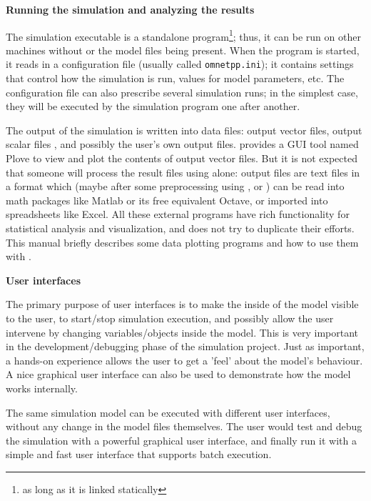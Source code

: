 \textbf{Running the simulation and analyzing the results}

The simulation executable is a standalone program\footnote{as long as
  it is linked statically}; thus, it can be run on other machines
without {\opp} or the model files being present. When the program is
started, it reads in a configuration
file (usually called
\texttt{omnetpp.ini}); it contains settings that
control how the simulation is run, values for model parameters, etc.
The configuration file can also prescribe several simulation runs; in
the simplest case, they will be executed by the simulation program one
after another.

The output of the simulation is written into data files: output vector
files, output scalar files
, and possibly the user's own output files.
{\opp} provides a GUI tool named Plove to view and plot the contents
of output vector files. But it is not expected that someone will
process the result files using {\opp} alone: output files are text
files in a format which (maybe after some preprocessing using
,  or ) can be read into math
packages like Matlab or its free equivalent Octave, or imported into
spreadsheets like Excel. All these external programs have rich
functionality for statistical analysis and visualization, and {\opp}
does not try to duplicate their efforts. This manual briefly describes
some data plotting programs and how to use them with {\opp}.


\textbf{User interfaces}

The primary purpose of user interfaces is to make the inside
of the model visible to the user, to start/stop simulation execution,
and possibly allow the user intervene by changing variables/objects
inside the model. This is very important in the development/debugging
phase of the simulation project. Just as important, a hands-on
experience allows the user to get a 'feel' about the model's
behaviour. A nice graphical user interface can also be used to
demonstrate how the model works internally.


The same simulation model can be executed with different user
interfaces, without any change in the model files themselves.
The user would test and debug the simulation with a powerful
graphical user interface, and finally run it with a simple and
fast user interface that supports batch execution.


